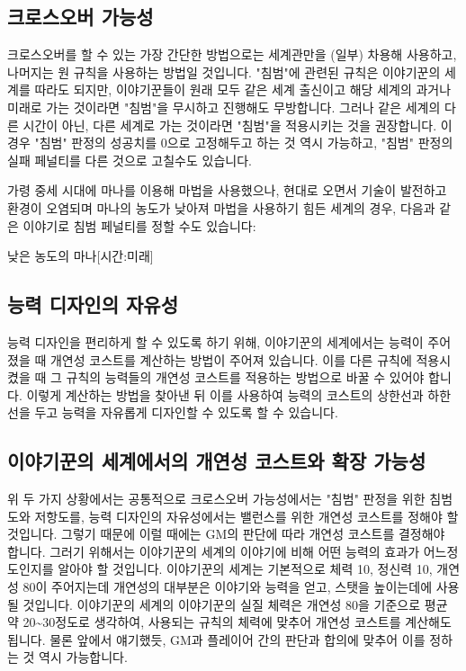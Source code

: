 \documentclass{report}
\begin{document}
	\subsection*{크로스오버 가능성}
	크로스오버를 할 수 있는 가장 간단한 방법으로는 세계관만을 (일부) 차용해 사용하고, 나머지는 원 규칙을 사용하는 방법일 것입니다. "침범"에 관련된 규칙은 이야기꾼의 세계를 따라도 되지만, 이야기꾼들이 원래 모두 같은 세계 출신이고 해당 세계의 과거나 미래로 가는 것이라면 "침범"을 무시하고 진행해도 무방합니다. 그러나 같은 세계의 다른 시간이 아닌, 다른 세계로 가는 것이라면 "침범"을 적용시키는 것을 권장합니다. 이 경우 "침범" 판정의 성공치를 0으로 고정해두고 하는 것 역시 가능하고, "침범" 판정의 실패 페널티를 다른 것으로 고칠수도 있습니다.
	
	가령 중세 시대에 마나를 이용해 마법을 사용했으나, 현대로 오면서 기술이 발전하고 환경이 오염되며 마나의 농도가 낮아져 마법을 사용하기 힘든 세계의 경우, 다음과 같은 이야기로 침범 페널티를 정할 수도 있습니다:
	
	\begin{story}{낮은 농도의 마나}{[시간:미래]}
	\end{story}
	
	\subsection*{능력 디자인의 자유성}
	능력 디자인을 편리하게 할 수 있도록 하기 위해, 이야기꾼의 세계에서는 능력이 주어졌을 때 개연성 코스트를 계산하는 방법이 주어져 있습니다. 이를 다른 규칙에 적용시켰을 때 그 규칙의 능력들의 개연성 코스트를 적용하는 방법으로 바꿀 수 있어야 합니다. 이렇게 계산하는 방법을 찾아낸 뒤 이를 사용하여 능력의 코스트의 상한선과 하한선을 두고 능력을 자유롭게 디자인할 수 있도록 할 수 있습니다.
	
	\subsection*{이야기꾼의 세계에서의 개연성 코스트와 확장 가능성}
	위 두 가지 상황에서는 공통적으로 크로스오버 가능성에서는 "침범" 판정을 위한 침범도와 저항도를, 능력 디자인의 자유성에서는 밸런스를 위한 개연성 코스트를 정해야 할 것입니다. 그렇기 때문에 이럴 때에는 GM의 판단에 따라 개연성 코스트를 결정해야 합니다. 그러기 위해서는 이야기꾼의 세계의 이야기에 비해 어떤 능력의 효과가 어느정도인지를 알아야 할 것입니다. 이야기꾼의 세계는 기본적으로 체력 10, 정신력 10, 개연성 80이 주어지는데 개연성의 대부분은 이야기와 능력을 얻고, 스탯을 높이는데에 사용될 것입니다. 이야기꾼의 세계의 이야기꾼의 실질 체력은 개연성 80을 기준으로 평균 약 20\textasciitilde30정도로 생각하여, 사용되는 규칙의 체력에 맞추어 개연성 코스트를 계산해도 됩니다. 물론 앞에서 얘기했듯, GM과 플레이어 간의 판단과 합의에 맞추어 이를 정하는 것 역시 가능합니다.
\end{document}
